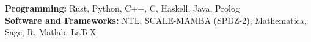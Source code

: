 \documentclass{res}
\begin{document}
\begin{resume}
\textbf{Programming:} Rust, Python, C++, C, Haskell, Java, Prolog\\         
\textbf{Software and Frameworks:} NTL, SCALE-MAMBA (SPDZ-2), Mathematica, Sage, R, Matlab, \LaTeX \\



%



\end{resume}
\end{document}
